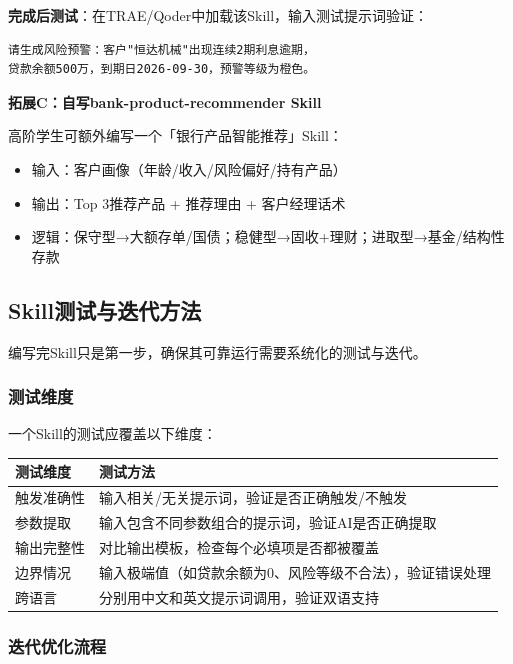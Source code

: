\textbf{完成后测试}：在TRAE/Qoder中加载该Skill，输入测试提示词验证：

\begin{lstlisting}
请生成风险预警：客户"恒达机械"出现连续2期利息逾期，
贷款余额500万，到期日2026-09-30，预警等级为橙色。
\end{lstlisting}

\textbf{拓展C：自写bank-product-recommender Skill}

高阶学生可额外编写一个「银行产品智能推荐」Skill：

\begin{itemize}[leftmargin=2em]
  \item 输入：客户画像（年龄/收入/风险偏好/持有产品）
  \item 输出：Top 3推荐产品 + 推荐理由 + 客户经理话术
  \item 逻辑：保守型→大额存单/国债；稳健型→固收+理财；进取型→基金/结构性存款
\end{itemize}

\subsection{Skill测试与迭代方法}

编写完Skill只是第一步，确保其可靠运行需要系统化的测试与迭代。

\subsubsection{测试维度}

一个Skill的测试应覆盖以下维度：

\begin{table}[H]
\centering
\begin{tabular}{lp{8cm}}
\toprule
\textbf{测试维度} & \textbf{测试方法} \\
\midrule
触发准确性 & 输入相关/无关提示词，验证是否正确触发/不触发 \\
参数提取 & 输入包含不同参数组合的提示词，验证AI是否正确提取 \\
输出完整性 & 对比输出模板，检查每个必填项是否都被覆盖 \\
边界情况 & 输入极端值（如贷款余额为0、风险等级不合法），验证错误处理 \\
跨语言 & 分别用中文和英文提示词调用，验证双语支持 \\
\bottomrule
\end{tabular}
\end{table}

\subsubsection{迭代优化流程}

